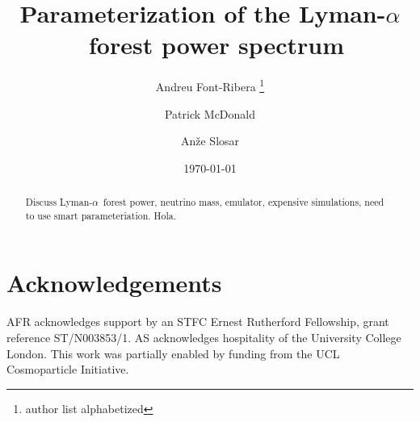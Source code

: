 \documentclass[preprintnumbers,prd,superscriptaddress,notitlepage,nofootinbib] {revtex4-1}
\newcommand{\lya}{Lyman-$\alpha$}
\begin{document}
\title{Parameterization of the \lya\ forest power spectrum}

\author{Andreu Font-Ribera \footnote{author list alphabetized}}
\author{Patrick McDonald}
\author{An\v{z}e Slosar}

\date{\today}

\begin{abstract}
Discuss \lya\ forest power, neutrino mass, emulator, expensive
simulations, need to use smart parameteriation.
Hola.
\end{abstract}

\maketitle















\section*{Acknowledgements}
AFR acknowledges support by an STFC Ernest Rutherford Fellowship, grant reference ST/N003853/1.
AS acknowledges hospitality of the University College London.
This work was partially enabled by funding from the UCL Cosmoparticle
Initiative.




\end{document}
